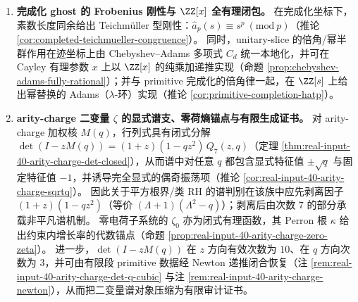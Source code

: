 \begin{enumerate}
  \item \textbf{完成化 ghost 的 Frobenius 刚性与 \texorpdfstring{$\ZZ[x]$}{Z[x]} 全有理闭包。}
  在完成化坐标下，素数长度同余给出 Teichm\"uller 型刚性：\(\widehat a_p(s)\equiv s^p\ (\mathrm{mod}\ p)\)（推论 \ref{cor:completed-teichmueller-congruence}）。
  同时，unitary-slice 的倍角/幂半群作用在迹坐标上由 Chebyshev--Adams 多项式 \(C_d\) 统一本地化，并可在 Cayley 有理参数 \(x\) 上以 \(\ZZ[x]\) 的纯乘加递推实现（命题 \ref{prop:chebyshev-adams-fully-rational}）；并与 primitive 完成化的倍角律一起，在 \(\ZZ[s]\) 上给出幂替换的 Adams（\(\lambda\)-环）实现（推论 \ref{cor:primitive-completion-hatp}）。

  \item \textbf{arity-charge 二变量 \texorpdfstring{$\zeta$}{zeta} 的显式谱支、零荷熵锚点与有限生成证书。}
  对 arity-charge 加权核 \(M(q)\)，行列式具有闭式分解 \(\det(I-zM(q))=(1+z)(1-qz^2)\,Q_7(z,q)\)（定理 \ref{thm:real-input-40-arity-charge-det-closed}），从而谱中对任意 \(q\) 都包含显式特征值 \(\pm\sqrt q\) 与固定特征值 \(-1\)，并诱导完全显式的偶奇振荡项（推论 \ref{cor:real-input-40-arity-charge-sqrtq}）。
  因此关于平方根界/类 RH 的谱判别在该族中应先剥离因子 \((1+z)(1-qz^2)\)（等价 \((\Lambda+1)(\Lambda^2-q)\)）；剥离后由次数 \(7\) 的部分承载非平凡谱机制。
  零电荷子系统的 \(\zeta_0\) 亦为闭式有理函数，其 Perron 根 \(\kappa\) 给出约束内增长率的代数锚点（命题 \ref{prop:real-input-40-arity-charge-zero-zeta}）。
  进一步，\(\det(I-zM(q))\) 在 \(z\) 方向有效次数为 \(10\)、在 \(q\) 方向次数为 \(3\)，并可由有限段 primitive 数据经 Newton 递推闭合恢复（注 \ref{rem:real-input-40-arity-charge-det-q-cubic} 与注 \ref{rem:real-input-40-arity-charge-newton}），从而把二变量谱对象压缩为有限审计证书。
\end{enumerate}

